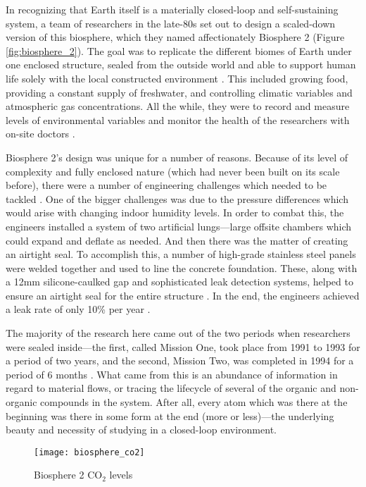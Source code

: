In recognizing that Earth itself is a materially closed-loop and self-sustaining system, a team of researchers in the late-80s set out to design a scaled-down version of this biosphere, which they named affectionately Biosphere 2 (Figure \ref{fig:biosphere_2}). The goal was to replicate the different biomes of Earth under one enclosed structure, sealed from the outside world and able to support human life solely with the local constructed environment \cite{biosphere_intro}. This included growing food, providing a constant supply of freshwater, and controlling climatic variables and atmospheric gas concentrations. All the while, they were to record and measure levels of environmental variables and monitor the health of the researchers with on-site doctors \cite{dempster_conf}.

Biosphere 2’s design was unique for a number of reasons. Because of its level of complexity and fully enclosed nature (which had never been built on its scale before), there were a number of engineering challenges which needed to be tackled \cite{biosphere_intro}. One of the bigger challenges was due to the pressure differences which would arise with changing indoor humidity levels. In order to combat this, the engineers installed a system of two artificial lungs—large offsite chambers which could expand and deflate as needed. And then there was the matter of creating an airtight seal. To accomplish this, a number of high-grade stainless steel panels were welded together and used to line the concrete foundation. These, along with a 12mm silicone-caulked gap and sophisticated leak detection systems, helped to ensure an airtight seal for the entire structure \cite{biosphere_closed_loop}. In the end, the engineers achieved a leak rate of only 10\% per year \cite{biosphere_leakage}.

The majority of the research here came out of the two periods when researchers were sealed inside—the first, called Mission One, took place from 1991 to 1993 for a period of two years, and the second, Mission Two, was completed in 1994 for a period of 6 months \cite{biosphere_mission_one}. What came from this is an abundance of information in regard to material flows, or tracing the lifecycle of several of the organic and non-organic compounds in the system. After all, every atom which was there at the beginning was there in some form at the end (more or less)—the underlying beauty and necessity of studying in a closed-loop environment.

\begin{wrapfigure}{l}{0.5\textwidth}
    \centering
    \texttt{[image: biosphere\_co2]}
    \caption{Biosphere 2 CO$_2$ levels}
    \label{fig:biosphere_co2}
\end{wrapfigure}

